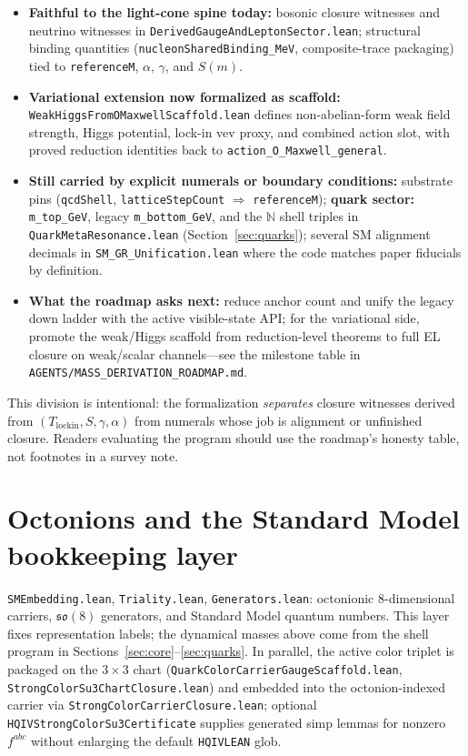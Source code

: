 \documentclass[11pt]{article}
\begin{document}
\begin{itemize}
  \item \textbf{Faithful to the light-cone spine today:} bosonic closure witnesses and neutrino witnesses in \texttt{DerivedGaugeAndLeptonSector.lean}; structural binding quantities (\texttt{nucleonSharedBinding\_MeV}, composite-trace packaging) tied to \texttt{referenceM}, $\alpha$, $\gamma$, and $S(m)$.
  \item \textbf{Variational extension now formalized as scaffold:} \texttt{WeakHiggsFromOMaxwellScaffold.lean} defines non-abelian-form weak field strength, Higgs potential, lock-in vev proxy, and combined action slot, with proved reduction identities back to \texttt{action\_O\_Maxwell\_general}.
  \item \textbf{Still carried by explicit numerals or boundary conditions:} substrate pins (\texttt{qcdShell}, \texttt{latticeStepCount} $\Rightarrow$ \texttt{referenceM}); \textbf{quark sector:} \texttt{m\_top\_GeV}, legacy \texttt{m\_bottom\_GeV}, and the $\mathbb{N}$ shell triples in \texttt{QuarkMetaResonance.lean} (Section~\ref{sec:quarks}); several SM alignment decimals in \texttt{SM\_GR\_Unification.lean} where the code matches paper fiducials by definition.
  \item \textbf{What the roadmap asks next:} reduce anchor count and unify the legacy down ladder with the active visible-state API; for the variational side, promote the weak/Higgs scaffold from reduction-level theorems to full EL closure on weak/scalar channels---see the milestone table in \texttt{AGENTS/MASS\_DERIVATION\_ROADMAP.md}.
\end{itemize}

\noindent
This division is intentional: the formalization \emph{separates} closure witnesses derived from $(T_{\mathrm{lockin}},S,\gamma,\alpha)$ from numerals whose job is alignment or unfinished closure. Readers evaluating the program should use the roadmap's honesty table, not footnotes in a survey note.

\section{Octonions and the Standard Model bookkeeping layer}

\texttt{SMEmbedding.lean}, \texttt{Triality.lean}, \texttt{Generators.lean}: octonionic $8$-dimensional carriers, $\mathfrak{so}(8)$ generators, and Standard Model quantum numbers. This layer fixes representation labels; the dynamical masses above come from the shell program in Sections~\ref{sec:core}--\ref{sec:quarks}.
In parallel, the active color triplet is packaged on the $3\times 3$ chart (\texttt{QuarkColorCarrierGaugeScaffold.lean}, \texttt{StrongColorSu3ChartClosure.lean}) and embedded into the octonion-indexed carrier via \texttt{StrongColorCarrierClosure.lean}; optional \texttt{HQIVStrongColorSu3Certificate} supplies generated simp lemmas for nonzero $f^{abc}$ without enlarging the default \texttt{HQIVLEAN} glob.
\end{document}
